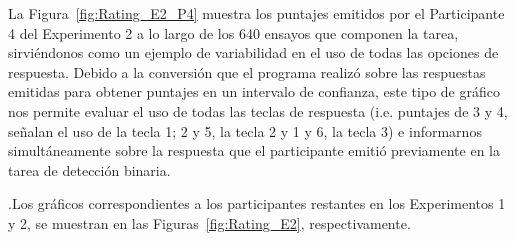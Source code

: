 \begin{itemize}
La Figura~\ref{fig:Rating_E2_P4} muestra los puntajes emitidos por el Participante 4 del Experimento 2 a lo largo de los 640 ensayos que componen la tarea, sirviéndonos como un ejemplo de variabilidad en el uso de todas las opciones de respuesta. Debido a la conversión que el programa realizó sobre las respuestas emitidas para obtener puntajes en un intervalo de confianza, este tipo de gráfico nos permite evaluar el uso de todas las teclas de respuesta (i.e. puntajes de 3 y 4, señalan el uso de la tecla 1; 2 y 5, la tecla 2 y 1 y 6, la tecla 3) e informarnos simultáneamente sobre la respuesta que el participante emitió previamente en la tarea de detección binaria.

.Los gráficos correspondientes a los participantes restantes en los Experimentos 1 y 2, se muestran en las Figuras~\ref{fig:Rating_E2}, respectivamente.\\

\end{itemize}

